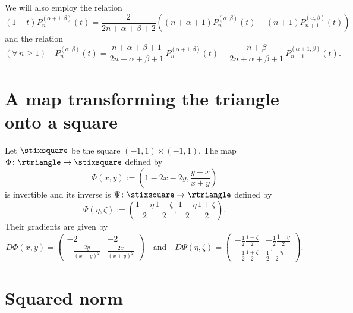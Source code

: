 \documentclass{article}
\numberwithin{equation}{section}
\numberwithin{figure}{section}
\begin{document}
%
We will also employ the relation \cite[Eq.~(4.5.4)]{Szego:1975}
%
\begin{equation}\label{JacobiTimesOneMinusArgShift}
(1-t) P^{(\alpha+1,\beta)}_n(t) = \frac{2}{2n+\alpha+\beta+2} \left( (n+\alpha+1) P^{(\alpha,\beta)}_n(t) - (n+1) P^{(\alpha,\beta)}_{n+1}(t) \right)
\end{equation}
%
and the relation \cite[Eq.~(6.4.21)]{AAR:1999}
%
\begin{equation}\label{JacobiAlphaIdShift}
(\forall\,n\geq 1) \quad P^{(\alpha,\beta)}_n(t) = \frac{n+\alpha+\beta+1}{2n+\alpha+\beta+1} \, P^{(\alpha+1,\beta)}_n(t) - \frac{n+\beta}{2n+\alpha+\beta+1} \, P^{(\alpha+1,\beta)}_{n-1}(t).
\end{equation}

\section{A map transforming the triangle onto a square}

Let $\stixsquare$ be the square $(-1,1) \times (-1,1)$.
The map $\Phi \colon \rtriangle \to \stixsquare$ defined by
%
\begin{equation}\label{Phi}
\Phi(x,y) := \left( 1-2x-2y, \frac{y-x}{x+y} \right)
\end{equation}
%
is invertible and its inverse is $\Psi \colon \stixsquare \to \rtriangle$ defined by
%
\begin{equation}\label{Psi}
\Psi(\eta,\zeta) := \left( \frac{1-\eta}{2} \frac{1-\zeta}{2}, \frac{1-\eta}{2} \frac{1+\zeta}{2} \right).
\end{equation}
%
Their gradients are given by
%
\begin{equation*}
D\Phi(x,y) = \begin{pmatrix} -2 & -2 \\ -\frac{2y}{(x+y)^2} & \frac{2x}{(x+y)^2} \end{pmatrix}
\quad\text{and}\quad
D\Psi(\eta,\zeta) = \begin{pmatrix} -\frac{1}{2} \frac{1-\zeta}{2} & -\frac{1}{2} \frac{1-\eta}{2} \\ -\frac{1}{2} \frac{1+\zeta}{2} & \frac{1}{2} \frac{1-\eta}{2} \end{pmatrix}.
\end{equation*}
%

\section{Squared norm}
\end{document}
